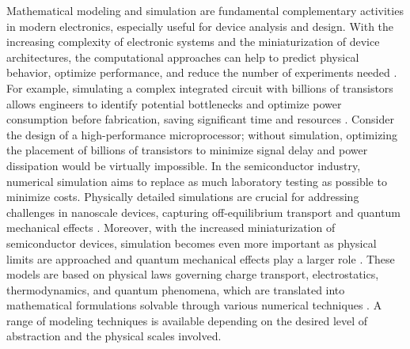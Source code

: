 
Mathematical modeling and simulation are fundamental complementary activities in modern electronics, especially useful for device analysis and design. With the increasing complexity of electronic systems and the miniaturization of device architectures, the computational approaches can help to predict physical behavior, optimize performance, and reduce the number of experiments needed \citep{markowichDrift1990}. For example, simulating a complex integrated circuit with billions of transistors allows engineers to identify potential bottlenecks and optimize power consumption before fabrication, saving significant time and resources \citep{zandShortChannel2020}. Consider the design of a high-performance microprocessor; without simulation, optimizing the placement of billions of transistors to minimize signal delay and power dissipation would be virtually impossible. In the semiconductor industry, numerical simulation aims to replace as much laboratory testing as possible to minimize costs. Physically detailed simulations are crucial for addressing challenges in nanoscale devices, capturing off-equilibrium transport and quantum mechanical effects \citep{hayatiCNTMOSFET2010}. Moreover, with the increased miniaturization of semiconductor devices, simulation becomes even more important as physical limits are approached and quantum mechanical effects play a larger role \citep{zandShortChannel2020}. 
These models are based on physical laws governing charge transport, electrostatics, thermodynamics, and quantum phenomena, which are translated into mathematical formulations solvable through various numerical techniques \citep{delavariNernst2021,hassaniniaSimulation2008,moghadamDesign2013}. A range of modeling techniques is available depending on the desired level of abstraction and the physical scales involved. 

